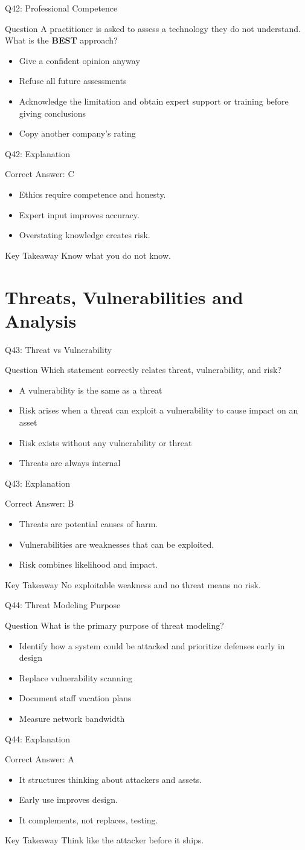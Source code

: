 \documentclass[aspectratio=169]{beamer}
\newcommand{\hq}[7]{%
	\begin{frame}{Q#1: #2}
		\begin{block}{Question}
			#3
		\end{block}
		\begin{itemize}
			#4
		\end{itemize}
	\end{frame}
	\begin{frame}{Q#1: Explanation}
		\begin{block}{Correct Answer: #5}
			\begin{itemize}
				#6
			\end{itemize}
		\end{block}
		\begin{alertblock}{Key Takeaway}
			#7
		\end{alertblock}
	\end{frame}
}
\begin{document}
	\hq{42}{Professional Competence}
	{A practitioner is asked to assess a technology they do not understand. What is the \textbf{BEST} approach?}
	{\item[\textbf{(A)}] Give a confident opinion anyway
		\item[\textbf{(B)}] Refuse all future assessments
		\item[\textbf{(C)}] Acknowledge the limitation and obtain expert support or training before giving conclusions
		\item[\textbf{(D)}] Copy another company's rating}
	{C}
	{\item Ethics require competence and honesty.
		\item Expert input improves accuracy.
		\item Overstating knowledge creates risk.}
	{Know what you do not know.}
	
	\section{Threats, Vulnerabilities and Analysis}
	
	\hq{43}{Threat vs Vulnerability}
	{Which statement correctly relates threat, vulnerability, and risk?}
	{\item[\textbf{(A)}] A vulnerability is the same as a threat
		\item[\textbf{(B)}] Risk arises when a threat can exploit a vulnerability to cause impact on an asset
		\item[\textbf{(C)}] Risk exists without any vulnerability or threat
		\item[\textbf{(D)}] Threats are always internal}
	{B}
	{\item Threats are potential causes of harm.
		\item Vulnerabilities are weaknesses that can be exploited.
		\item Risk combines likelihood and impact.}
	{No exploitable weakness and no threat means no risk.}
	
	\hq{44}{Threat Modeling Purpose}
	{What is the primary purpose of threat modeling?}
	{\item[\textbf{(A)}] Identify how a system could be attacked and prioritize defenses early in design
		\item[\textbf{(B)}] Replace vulnerability scanning
		\item[\textbf{(C)}] Document staff vacation plans
		\item[\textbf{(D)}] Measure network bandwidth}
	{A}
	{\item It structures thinking about attackers and assets.
		\item Early use improves design.
		\item It complements, not replaces, testing.}
	{Think like the attacker before it ships.}
	
\end{document}
